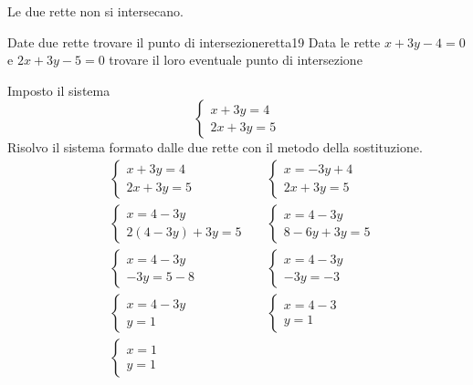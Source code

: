 Le due rette non si intersecano.
\begin{esempiot}{Date due rette trovare il punto di intersezione}{retta19}
	Data le rette $x+3y-4=0$ e $2x+3y-5=0$ trovare il loro eventuale punto di intersezione
\end{esempiot}
Imposto il sistema 
\[\begin{cases} 
x+3y=4\\
2x+3y=5
\end{cases}\]
Risolvo il sistema formato dalle due rette  con il metodo della sostituzione.
\begin{align*}
&\begin{cases} 
x+3y=4\\
2x+3y=5
\end{cases}&&\begin{cases} 
x=-3y+4\\
2x+3y=5
\end{cases}\\
&\begin{cases} 
x=4-3y\\
2(4-3y)+3y=5
\end{cases}&&\begin{cases} 
x=4-3y\\
8-6y+3y=5
\end{cases}\\
&\begin{cases} 
x=4-3y\\
-3y=5-8
\end{cases}&&\begin{cases} 
x=4-3y\\
-3y=-3
\end{cases}\\
&\begin{cases} 
x=4-3y\\
y=1
\end{cases}&&\begin{cases} 
x=4-3\\
y=1
\end{cases}\\
&\begin{cases} 
x=1\\
y=1
\end{cases}\\
\end{align*}
